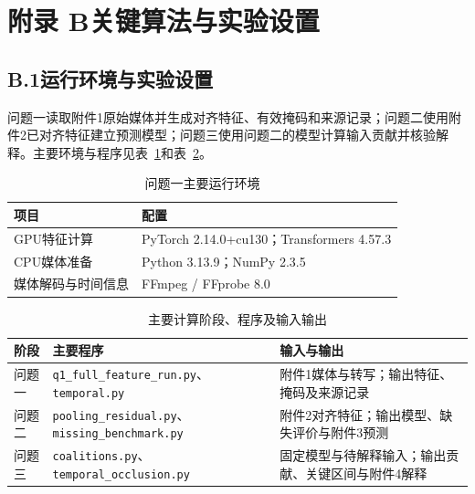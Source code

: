 \section*{附录 B\quad 关键算法与实验设置}
\begingroup
\normalsize\songti
\setcounter{table}{0}
\renewcommand{\thetable}{B\arabic{table}}

\subsection*{B.1\quad 运行环境与实验设置}
问题一读取附件1原始媒体并生成对齐特征、有效掩码和来源记录；问题二使用附件2已对齐特征建立预测模型；问题三使用问题二的模型计算输入贡献并核验解释。主要环境与程序见表~\ref{tab:app_b_env}和表~\ref{tab:app_b_flow}。

\begin{table}[H]
\centering\normalsize
\caption{问题一主要运行环境}\label{tab:app_b_env}
\begin{tabularx}{0.90\textwidth}{@{}>{\raggedright\arraybackslash}p{4.4cm}>{\raggedright\arraybackslash}X@{}}
\toprule 项目 & 配置\\\midrule
GPU特征计算 & PyTorch 2.14.0+cu130；Transformers 4.57.3\\
CPU媒体准备 & Python 3.13.9；NumPy 2.3.5\\
媒体解码与时间信息 & FFmpeg / FFprobe 8.0\\
\bottomrule\end{tabularx}
\end{table}
\begin{table}[H]
\centering\normalsize
\caption{主要计算阶段、程序及输入输出}\label{tab:app_b_flow}
\begin{tabularx}{\textwidth}{@{}>{\raggedright\arraybackslash}p{1.5cm}>{\raggedright\arraybackslash}p{4.7cm}>{\raggedright\arraybackslash}X@{}}
\toprule 阶段 & 主要程序 & 输入与输出\\\midrule
问题一 & \nolinkurl{q1_full_feature_run.py}、\nolinkurl{temporal.py} & 附件1媒体与转写；输出特征、掩码及来源记录\\
问题二 & \nolinkurl{pooling_residual.py}、\nolinkurl{missing_benchmark.py} & 附件2对齐特征；输出模型、缺失评价与附件3预测\\
问题三 & \nolinkurl{coalitions.py}、\nolinkurl{temporal_occlusion.py} & 固定模型与待解释输入；输出贡献、关键区间与附件4解释\\
\bottomrule\end{tabularx}\end{table}

